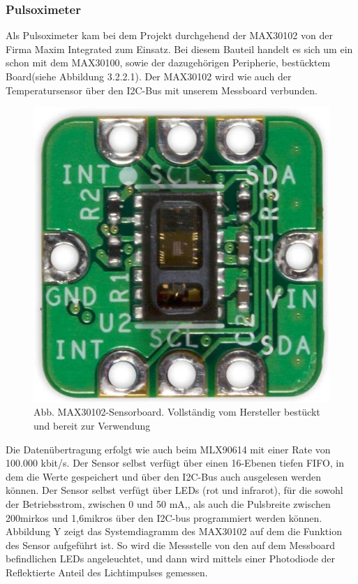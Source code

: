 \subsubsection{Pulsoximeter} \label{pulsoximeter-1}

Als Pulsoximeter kam bei dem Projekt durchgehend der MAX30102 von der Firma Maxim Integrated zum Einsatz. Bei diesem Bauteil handelt es sich um ein schon mit dem MAX30100, sowie der dazugehörigen Peripherie, bestücktem Board(siehe Abbildung 3.2.2.1). Der MAX30102 wird wie auch der Temperatursensor über den I2C-Bus mit unserem Messboard verbunden.

\begin{figure}[H] \centering
\includegraphics[width=\textwidth]{Images/MAX30102.png} 
\vspace{-0.3cm} 
\caption{Abb. MAX30102-Sensorboard. Vollständig vom Hersteller bestückt und bereit zur Verwendung}
\label{fig-elise} 
\end{figure}

Die Datenübertragung erfolgt wie auch beim MLX90614 mit einer Rate von  100.000 kbit/s. Der Sensor selbst verfügt über einen 16-Ebenen tiefen FIFO, in dem die Werte gespeichert und über den I2C-Bus auch ausgelesen werden können. Der Sensor selbst verfügt über LEDs (rot und infrarot), für die sowohl der Betriebsstrom, zwischen 0 und 50 mA,, als auch die Pulsbreite zwischen 200mirkos und 1,6mikros über den I2C-bus programmiert werden können. Abbildung Y zeigt das Systemdiagramm des MAX30102 auf dem die Funktion des Sensor aufgeführt ist. So wird die Messstelle von den auf dem Messboard befindlichen LEDs angeleuchtet, und dann wird mittels einer Photodiode der Reflektierte Anteil des Lichtimpulses gemessen.


